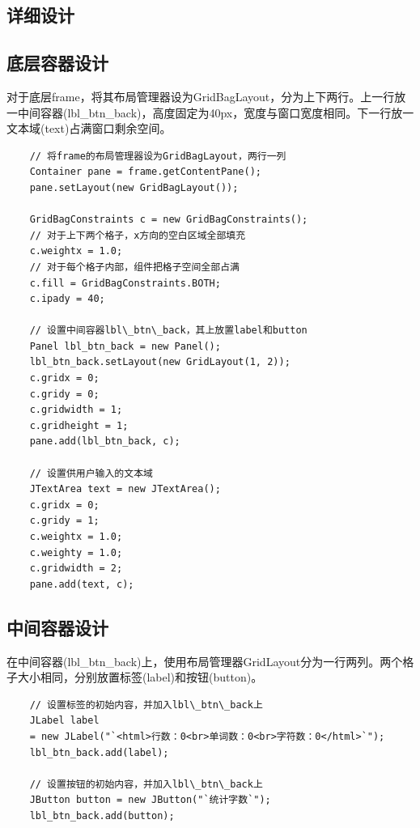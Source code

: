 \documentclass[11pt, a4paper]{article}
\begin{document}
\begin{CJK*}{UTF8}{gbsn}
  
  \section{详细设计}

  \subsection{底层容器设计}
  对于底层frame，将其布局管理器设为GridBagLayout，分为上下两行。上一行放一中间容器(lbl\_btn\_back)，高度固定为40px，宽度与窗口宽度相同。下一行放一文本域(text)占满窗口剩余空间。

  \begin{lstlisting}
    // 将frame的布局管理器设为GridBagLayout，两行一列
    Container pane = frame.getContentPane();
    pane.setLayout(new GridBagLayout());

    GridBagConstraints c = new GridBagConstraints();
    // 对于上下两个格子，x方向的空白区域全部填充
    c.weightx = 1.0;  
    // 对于每个格子内部，组件把格子空间全部占满
    c.fill = GridBagConstraints.BOTH;
    c.ipady = 40;

    // 设置中间容器lbl\_btn\_back，其上放置label和button
    Panel lbl_btn_back = new Panel();
    lbl_btn_back.setLayout(new GridLayout(1, 2));
    c.gridx = 0;
    c.gridy = 0;
    c.gridwidth = 1;
    c.gridheight = 1;
    pane.add(lbl_btn_back, c);

    // 设置供用户输入的文本域
    JTextArea text = new JTextArea();
    c.gridx = 0;
    c.gridy = 1;
    c.weightx = 1.0;
    c.weighty = 1.0;
    c.gridwidth = 2;
    pane.add(text, c);
  \end{lstlisting}

  \subsection{中间容器设计}
  
  在中间容器(lbl\_btn\_back)上，使用布局管理器GridLayout分为一行两列。两个格子大小相同，分别放置标签(label)和按钮(button)。

  \begin{lstlisting}
    // 设置标签的初始内容，并加入lbl\_btn\_back上
    JLabel label
    = new JLabel("`<html>行数：0<br>单词数：0<br>字符数：0</html>`");
    lbl_btn_back.add(label);

    // 设置按钮的初始内容，并加入lbl\_btn\_back上
    JButton button = new JButton("`统计字数`");
    lbl_btn_back.add(button);
  \end{lstlisting}


\end{CJK*}
\end{document}
